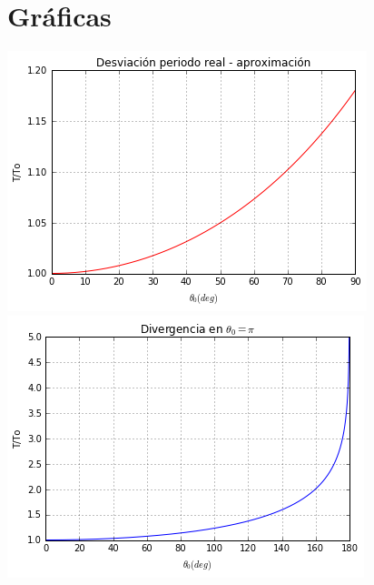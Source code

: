 \documentclass[11pt,spanish]{article}
\begin{document}
\section*{Gráficas}

\centering

\includegraphics{plot}\\
\includegraphics{plot2}\\
\end{document}
